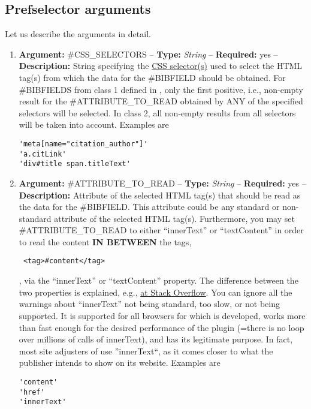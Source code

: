 \documentclass[
a4paper,
12pt,
]
{article}
\begin{document}
\subsection{Prefselector arguments}
Let us describe the arguments in detail.
\begin{enumerate}
 \item \textbf{Argument:} \#CSS\_SELECTORS -- \textbf{Type:} \textit{String} -- \textbf{Required:} yes -- \textbf{Description:} String specifying the \href{https://www.w3schools.com/cssref/css_selectors.asp}{CSS selector(s)} used to select the HTML tag(s) from which the data for the \#BIBFIELD should be obtained. For \#BIBFIELDS from class 1 defined in , only the first positive, i.e., non-empty result for the \#ATTRIBUTE\_TO\_READ obtained by ANY of the specified selectors will be selected. In class 2, all non-empty results from all selectors will be taken into account. Examples are
 \begin{center}
\begin{lstlisting}
'meta[name="citation_author"]'
'a.citLink'
'div#title span.titleText'
\end{lstlisting}
\end{center}

 \item \textbf{Argument:} \#ATTRIBUTE\_TO\_READ -- \textbf{Type:} \textit{String} -- \textbf{Required:} yes -- \textbf{Description:} Attribute of the selected HTML tag(s) that should be read as the data for the \#BIBFIELD. This attribute could be any standard or non-standard attribute of the selected HTML tag(s). Furthermore, you may set \#ATTRIBUTE\_TO\_READ to either ``innerText'' or ``textContent'' in order to read the content \textbf{IN BETWEEN} the tags,
 \begin{center}
\begin{lstlisting}
 <tag>#content</tag>
\end{lstlisting}
\end{center}
 , via the ``innerText'' or ``textContent'' property. 
 The difference between the two properties is explained, e.g., \href{https://stackoverflow.com/questions/35213147/difference-between-text-content-vs-inner-text}{at Stack Overflow}. 
 You can ignore all the warnings about ``innerText'' not being standard, too slow, or not being supported. It is supported for all browsers for which {\plgname} is developed, works more than fast enough for the desired performance of the plugin (=there is no loop over millions of calls of innerText), and has its legitimate purpose. In fact, most site adjusters of {\plgname} use ''innerText``, as it comes closer to what the publisher intends to show on its website. Examples are
\begin{center}
\begin{lstlisting}
'content'
'href'
'innerText'
\end{lstlisting}
\end{center}


\end{enumerate}
\end{document}
